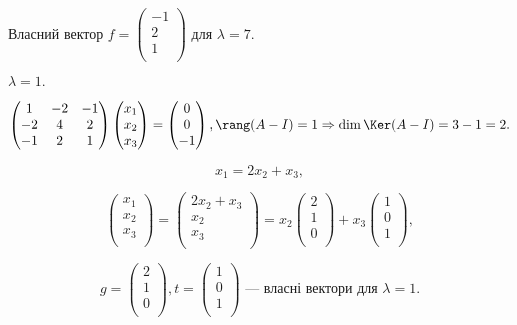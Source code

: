 Власний вектор $f = \begin{pmatrix}
	-1 \\
	2 \\
	1 \\
\end{pmatrix}$ для $\lambda = 7$.

$\lambda = 1.$

$$\begin{pmatrix}
	1 & -2 & -1 \\
	-2 & 4 & 2  \\
	-1 &  2 & 1 \\
\end{pmatrix} \begin{pmatrix}
	x_1 \\
	x_2 \\
	x_3 \\
\end{pmatrix} = \begin{pmatrix}
	0 \\
	0 \\
	-1 \\
\end{pmatrix}, \rang(A-I) = 1 \Rightarrow \dim \Ker(A-I) = 3 - 1 = 2.$$

$$x_1 = 2x_2 + x_3,$$

$$\begin{pmatrix}
	x_1 \\
	x_2 \\
	x_3 \\
\end{pmatrix} = \begin{pmatrix}
	2x_2 + x_3 \\
	x_2 \\
	x_3 \\
\end{pmatrix} = x_2 \begin{pmatrix}
	2 \\
	1 \\
	0 \\
\end{pmatrix} + x_3 \begin{pmatrix}
	1 \\
	0 \\
	1 \\
\end{pmatrix},$$

$$g = \begin{pmatrix}
	2 \\
	1 \\
	0 \\
\end{pmatrix}, t = \begin{pmatrix}
	1 \\
	0 \\
	1 \\
\end{pmatrix} \text{ --- власні вектори для } \lambda = 1.$$

